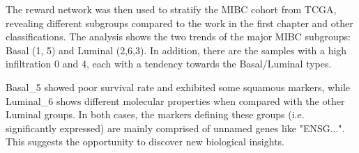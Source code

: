 The reward network was then used to stratify the MIBC cohort from TCGA, revealing different subgroups compared to the work in the first chapter and other classifications. The analysis shows the two trends of the major MIBC subgroups: Basal (1, 5) and Luminal (2,6,3). In addition, there are the samples with a high infiltration 0 and 4, each with a tendency towards the Basal/Luminal types. 


Basal\_5 showed poor survival rate and exhibited some squamous markers, while Luminal\_6 shows different molecular properties when compared with the other Luminal groups. In both cases, the markers defining these groups (i.e. significantly expressed) are mainly comprised of unnamed genes like "ENSG...". This suggests the opportunity to discover new biological insights.





